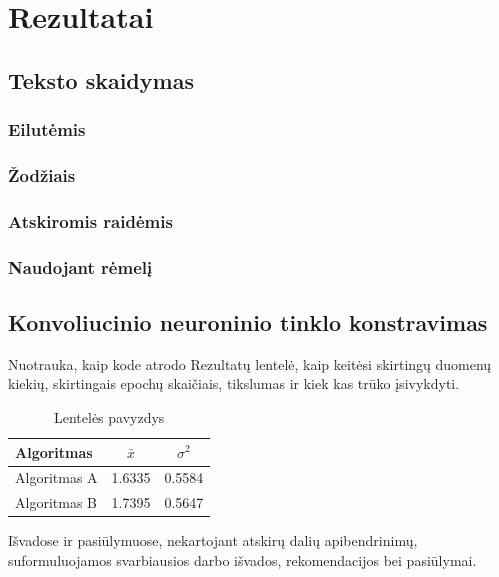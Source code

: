 \documentclass{VUMIFInfBakalaurinis}
\begin{document}
\section{Rezultatai}

\subsection{Teksto skaidymas}
\subsubsection{Eilutėmis}
\subsubsection{Žodžiais}
\subsubsection{Atskiromis raidėmis}
\subsubsection{Naudojant rėmelį}

\subsection{Konvoliucinio neuroninio tinklo konstravimas}

Nuotrauka, kaip kode atrodo
Rezultatų lentelė, kaip keitėsi skirtingų duomenų kiekių, skirtingais epochų skaičiais, tikslumas ir kiek kas trūko įsivykdyti.


\begin{table}[H]\footnotesize
  \centering
  \caption{Lentelės pavyzdys}
  {\begin{tabular}{|l|c|c|} \hline
    Algoritmas & $\bar{x}$ & $\sigma^{2}$ \\
    \hline
    Algoritmas A  & 1.6335    & 0.5584       \\
    Algoritmas B  & 1.7395    & 0.5647       \\
    \hline
  \end{tabular}}
  \label{tab:table example}
\end{table}



Išvadose ir pasiūlymuose, nekartojant atskirų dalių apibendrinimų,
suformuluojamos svarbiausios darbo išvados, rekomendacijos bei pasiūlymai.
\end{document}
